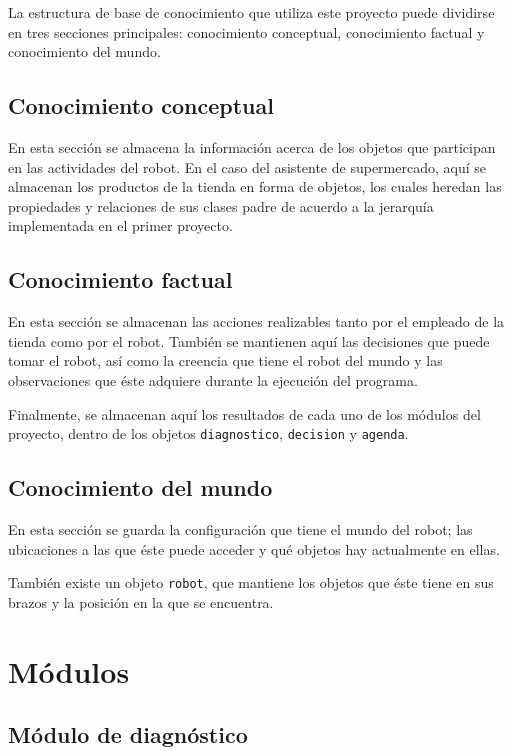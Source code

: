 \documentclass[11pt]{article}
\begin{document}
La estructura de base de conocimiento que utiliza este proyecto puede dividirse en tres secciones principales: conocimiento conceptual, conocimiento factual y conocimiento del mundo.

\subsection{Conocimiento conceptual}

En esta sección se almacena la información acerca de los objetos que participan en las actividades del robot. En el caso del asistente de supermercado, aquí se almacenan los productos de la tienda en forma de objetos, los cuales heredan las propiedades y relaciones de sus clases padre de acuerdo a la jerarquía implementada en el primer proyecto.

\subsection{Conocimiento factual}

En esta sección se almacenan las acciones realizables tanto por el empleado de la tienda como por el robot. También se mantienen aquí las decisiones que puede tomar el robot, así como la creencia que tiene el robot del mundo y las observaciones que éste adquiere durante la ejecución del programa.

Finalmente, se almacenan aquí los resultados de cada uno de los módulos del proyecto, dentro de los objetos \texttt{diagnostico}, \texttt{decision} y \texttt{agenda}.

\subsection{Conocimiento del mundo}

En esta sección se guarda la configuración que tiene el mundo del robot; las ubicaciones a las que éste puede acceder y qué objetos hay actualmente en ellas.

También existe un objeto \texttt{robot}, que mantiene los objetos que éste tiene en sus brazos y la posición en la que se encuentra.

\section{Módulos}

\subsection{Módulo de diagnóstico}
\end{document}
